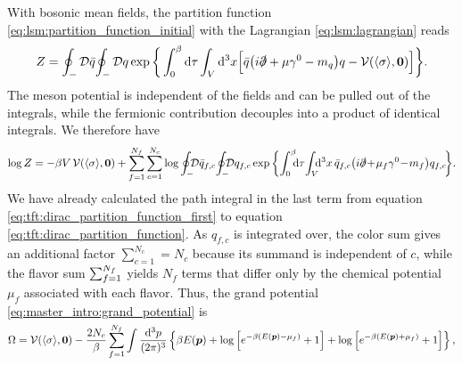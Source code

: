 With bosonic mean fields, the partition function \eqref{eq:lsm:partition_function_initial} with the Lagrangian \eqref{eq:lsm:lagrangian} reads
\begin{equation}
	Z = \oint_- \mathcal{D} \bar{q} \! \oint_- \mathcal{D} q \exp \bigg\{ \int_0^{\beta} \mathop{}\!\mathrm{d} \tau \int_V \mathop{}\!\mathrm{d}^3 x \Big[ \bar{q} \big( i \slashed\partial + \mu \gamma^0 - m_q \big) q - \mathcal{V}(\langle \sigma \rangle,{\bm{0}}) \Big] \bigg\}.
\end{equation}
The meson potential is independent of the fields and can be pulled out of the integrals,
while the fermionic contribution decouples into a product of identical integrals.
We therefore have
\begin{equation}
\begin{split}
	\log Z = -\beta V \, \pot(\avg{\sigma},\vec{0}) + \sum_{f=1}^{\smash{N_f}} \sum_{c=1}^{N_c} \log \oint_- \!\!\! \pathintdif \bar{q}_{f,c} \! \oint_- \!\!\! \pathintdif q_{f,c} \exp \bigg\{ \! \int_0^\beta \!\!\! \dif \tau \! \int_V \!\!\! \dif^3 x \, \bar{q}_{f,c} \big(i \slashed\partial \!+\! \mu_f \gamma^0 \!-\! m_f \big) q_{f,c} \! \bigg\} .
\end{split}
\end{equation}
We have already calculated the path integral in the last term
from equation \eqref{eq:tft:dirac_partition_function_first} to equation \eqref{eq:tft:dirac_partition_function}.
As $q_{f,c}$ is integrated over, the color sum gives an additional factor $\sum_{c=1}^{N_c} = N_c$ because its summand is independent of $c$,
while the flavor sum $\sum_{f=1}^{\smash{N_f}}$ yields $N_f$ terms that differ only by the chemical potential $\mu_f$ associated with each flavor.
Thus, the grand potential \eqref{eq:master_intro:grand_potential} is
\begin{equation}
\begin{split}
	\Omega = \mathcal{V}(\langle \sigma \rangle,{\bm{0}}) - \frac{2 N_c}{\beta} \sum_{f=1}^{\smash{N_f}} \int \frac{\mathop{}\!\mathrm{d}^3 p}{(2 \pi)^3} \left\{ \beta E({\bm{p}}) + \log \left[ e^{-\beta (E({\bm{p}}) - \mu_f)}+1 \right] + \log \left[ e^{-\beta (E({\bm{p}}) + \mu_f)} + 1\right] \right\} ,
\end{split}
\label{eq:lsm:potential_divergent_logz0}
\end{equation}
